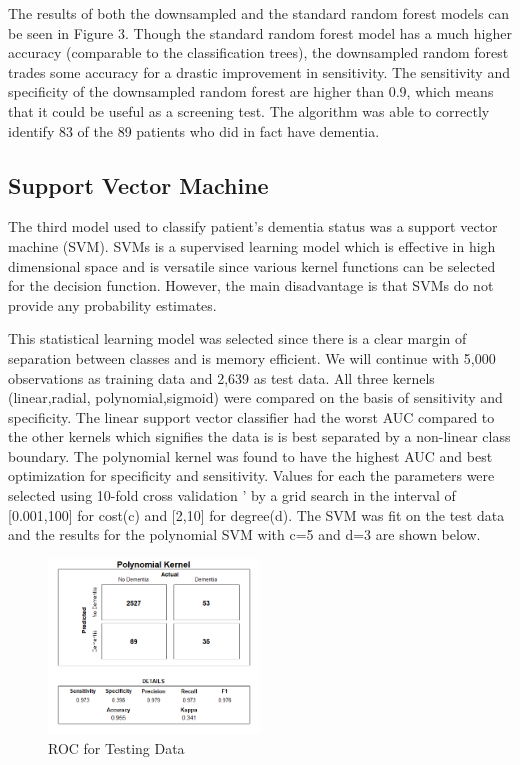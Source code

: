\documentclass[a4paper,man,natbib,11pt]{article}
\begin{document}
The results of both the downsampled and the standard random forest models can be seen in Figure 3. Though the standard random forest model has a much higher accuracy (comparable to the classification trees), the downsampled random forest trades some accuracy for a drastic improvement in sensitivity. The sensitivity and specificity of the downsampled random forest are higher than 0.9, which means that it could be useful as a screening test. The algorithm was able to correctly identify 83 of the 89 patients who did in fact have dementia.

\subsection{Support Vector Machine}
The third model used to classify patient's dementia status was a support vector machine (SVM). SVMs is a supervised learning model which is effective in high dimensional space and is versatile since various kernel functions can be selected for the decision function. However, the main disadvantage is that SVMs do not provide any probability estimates. 

This statistical learning model was selected since there is a clear margin of separation between classes and is  memory efficient. We will continue with 5,000  observations as training data and 2,639 as test data. All three kernels (linear,radial, polynomial,sigmoid) were compared on the basis of sensitivity and specificity. The linear support vector classifier had the worst AUC compared to the other kernels which signifies the data is is best separated by a non-linear class boundary. The polynomial kernel was found to have the highest AUC and best optimization for specificity and sensitivity. Values for each the parameters were selected using 10-fold cross validation ’ by a grid search in the interval of [0.001,100] for cost(c) and [2,10] for degree(d). The SVM was fit on the test data and the results for the polynomial SVM with c=5 and d=3 are shown below.

\begin{figure}[h!]
\centering
  \includegraphics[width=0.5\textwidth]{poly_first_mod.png}
  \caption{ROC for Testing Data}
\end{figure}
\end{document}
